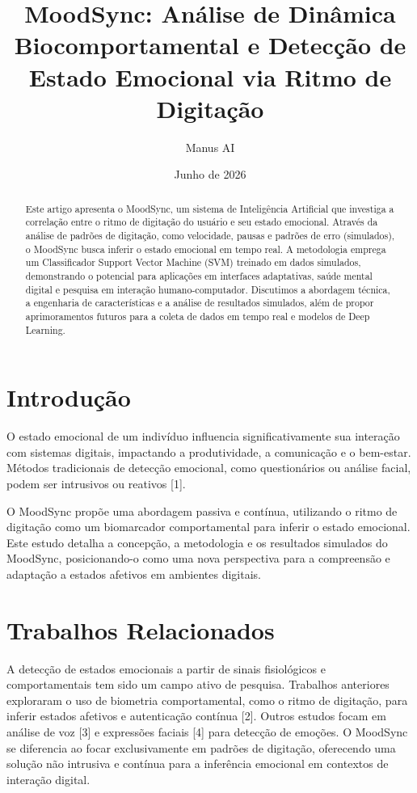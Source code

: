 \documentclass{article}
\title{MoodSync: Análise de Dinâmica Biocomportamental e Detecção de Estado Emocional via Ritmo de Digitação}
\author{Manus AI}
\date{Junho de 2026}
\begin{document}
\maketitle

\begin{abstract}
Este artigo apresenta o MoodSync, um sistema de Inteligência Artificial que investiga a correlação entre o ritmo de digitação do usuário e seu estado emocional. Através da análise de padrões de digitação, como velocidade, pausas e padrões de erro (simulados), o MoodSync busca inferir o estado emocional em tempo real. A metodologia emprega um Classificador Support Vector Machine (SVM) treinado em dados simulados, demonstrando o potencial para aplicações em interfaces adaptativas, saúde mental digital e pesquisa em interação humano-computador. Discutimos a abordagem técnica, a engenharia de características e a análise de resultados simulados, além de propor aprimoramentos futuros para a coleta de dados em tempo real e modelos de Deep Learning.
\end{abstract}

\section{Introdução}

O estado emocional de um indivíduo influencia significativamente sua interação com sistemas digitais, impactando a produtividade, a comunicação e o bem-estar. Métodos tradicionais de detecção emocional, como questionários ou análise facial, podem ser intrusivos ou reativos [1].

O MoodSync propõe uma abordagem passiva e contínua, utilizando o ritmo de digitação como um biomarcador comportamental para inferir o estado emocional. Este estudo detalha a concepção, a metodologia e os resultados simulados do MoodSync, posicionando-o como uma nova perspectiva para a compreensão e adaptação a estados afetivos em ambientes digitais.

\section{Trabalhos Relacionados}

A detecção de estados emocionais a partir de sinais fisiológicos e comportamentais tem sido um campo ativo de pesquisa. Trabalhos anteriores exploraram o uso de biometria comportamental, como o ritmo de digitação, para inferir estados afetivos e autenticação contínua [2]. Outros estudos focam em análise de voz [3] e expressões faciais [4] para detecção de emoções. O MoodSync se diferencia ao focar exclusivamente em padrões de digitação, oferecendo uma solução não intrusiva e contínua para a inferência emocional em contextos de interação digital.
\end{document}
